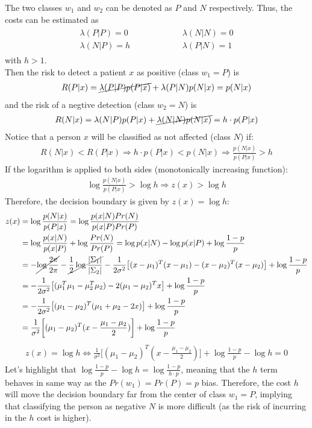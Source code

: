 \Answer[number={7}]
The two classes \(w_1\) and \(w_2\) can be denoted as \(P\) and \(N\)
respectively. Thus, the costs can be estimated as
\begin{align*}
    \begin{matrix}
        \lambda(P|P)=0 && \quad\quad\quad && \lambda(N|N)=0\\
        \lambda(N|P)=h && \quad\quad\quad && \lambda(P|N)=1
    \end{matrix}
\end{align*}
with \(h>1\).\\
Then the risk to detect a patient \(x\) as positive (class \(w_1=P\)) is
\begin{align*}
    R(P|x)
    =\cancel{\lambda(P|P)p(P|x)}+\lambda(P|N)p(N|x)
    =p(N|x)
\end{align*}
and the risk of a negtive detection (class \(w_2=N\)) is
\begin{align*}
    R(N|x)
    =\lambda(N|P)p(P|x)+\cancel{\lambda(N|N)p(N|x)}
    =h\cdot p(P|x)
\end{align*}
Notice that a person \(x\) will be classified as not affected (class \(N\))
if:
\begin{align*}
    R(N|x)<R(P|x)
    \Rightarrow h\cdot p(P|x)<p(N|x)
    \Rightarrow \frac{p(N|x)}{p(P|x)}>h
\end{align*}
If the logarithm is applied to both sides (monotonically increasing function):
\begin{align*}
    \log{\frac{p(N|x)}{p(P|x)}}>\log{h}
    \Rightarrow z(x)>\log{h}
\end{align*}
Therefore, the decision boundary is given by \(z(x)=\log{h}\):
\begin{align*}
    z(x)
    &=\log{\frac{p(N|x)}{p(P|x)}}
    =\log{\frac{p(x|N)Pr(N)}{p(x|P)Pr(P)}}\\
    &=\log{\frac{p(x|N)}{p(x|P)}} + \log{\frac{Pr(N)}{Pr(P)}}
    =\log{p(x|N)}-\log{p(x|P)}+\log{\frac{1-p}{p}}\\
    &=-\cancel{\log{\frac{2\pi}{2\pi}}}-\cancel{\frac{1}{2}\log{\frac{|\Sigma_1|}{|\Sigma_2|}}}-\frac{1}{2\sigma^2}\bigl[(x-\mu_1)^T(x-\mu_1)-(x-\mu_2)^T(x-\mu_2)\bigr]+\log{\frac{1-p}{p}}\\
    &=-\frac{1}{2\sigma^2}\bigl[(\mu_1^T\mu_1-\mu_2^T\mu_2)-2(\mu_1-\mu_2)^Tx\bigr]+\log{\frac{1-p}{p}}\\
    &=-\frac{1}{2\sigma^2}\bigl[(\mu_1-\mu_2)^T(\mu_1+\mu_2-2x)\bigr]+\log{\frac{1-p}{p}}\\
    &=\frac{1}{\sigma^2}\biggl[(\mu_1-\mu_2)^T(x-\frac{\mu_1-\mu_2}{2})\biggr]+\log{\frac{1-p}{p}}
\end{align*}
\begin{align*}
    z(x)=\log{h} \Longleftrightarrow \frac{1}{\sigma^2}\biggl[(\mu_1-\mu_2)^T(x-\frac{\mu_1-\mu_2}{2})\biggr]+\log{\frac{1-p}{p}}-\log{h}=0
\end{align*}
Let's highlight that
\(\log{\frac{1-p}{p}}-\log{h}=\log{\frac{1-p}{h\cdot p}}\), meaning that
the \(h\) term behaves in same way as the \(Pr(w_1)=Pr(P)=p\) bias.
Therefore, the cost \(h\) will move the decision boundary far from the
center of class \(w_1=P\), implying that classifying the person as negative
\(N\) is more difficult (as the risk of incurring in the \(h\) cost is
higher).